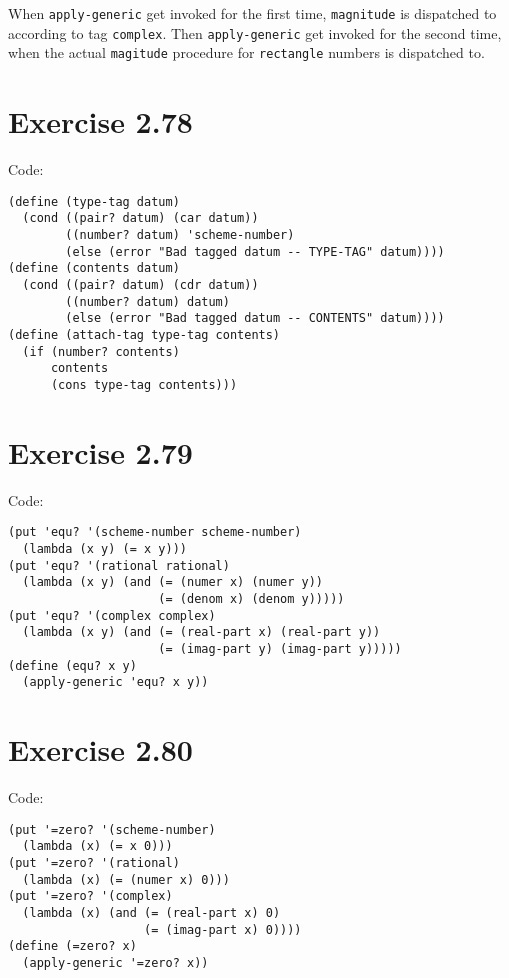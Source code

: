 \documentclass[../main.tex]{subfiles}
\begin{document}
When \lstinline{apply-generic} get invoked for the first time,
 \lstinline{magnitude} is dispatched to according to tag
 \lstinline{complex}. Then \lstinline{apply-generic} get invoked
 for the second time, when the actual \lstinline{magitude}
 procedure for \lstinline{rectangle} numbers is dispatched to.

\section{Exercise 2.78}

Code:

\begin{lstlisting}
(define (type-tag datum)
  (cond ((pair? datum) (car datum))
        ((number? datum) 'scheme-number)
        (else (error "Bad tagged datum -- TYPE-TAG" datum))))
(define (contents datum)
  (cond ((pair? datum) (cdr datum))
        ((number? datum) datum)
        (else (error "Bad tagged datum -- CONTENTS" datum))))
(define (attach-tag type-tag contents)
  (if (number? contents)
      contents
      (cons type-tag contents)))
\end{lstlisting}

\section{Exercise 2.79}

Code:

\begin{lstlisting}
(put 'equ? '(scheme-number scheme-number)
  (lambda (x y) (= x y)))
(put 'equ? '(rational rational)
  (lambda (x y) (and (= (numer x) (numer y))
                     (= (denom x) (denom y)))))
(put 'equ? '(complex complex)
  (lambda (x y) (and (= (real-part x) (real-part y))
                     (= (imag-part y) (imag-part y)))))
(define (equ? x y)
  (apply-generic 'equ? x y))
\end{lstlisting}

\section{Exercise 2.80}

Code:

\begin{lstlisting}
(put '=zero? '(scheme-number)
  (lambda (x) (= x 0)))
(put '=zero? '(rational)
  (lambda (x) (= (numer x) 0)))
(put '=zero? '(complex)
  (lambda (x) (and (= (real-part x) 0)
                   (= (imag-part x) 0))))
(define (=zero? x)
  (apply-generic '=zero? x))
\end{lstlisting}
\end{document}
